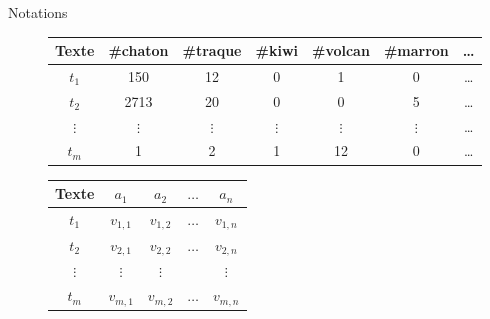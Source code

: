 \documentclass[../allslides.tex]{subfiles}
\begin{document}
\begin{frame}{Notations}
	\begin{overprint}
			\begin{figure}
				\begin{tabular}{c*{5}{S[table-format=4.0]}c}
					\toprule
					\textbf{Texte}	& {\textbf{\#chaton}}	& {\textbf{\#traque}}	& {\textbf{\#kiwi}}	& {\textbf{\#volcan}}	& {\textbf{\#marron}}	& {…}\\
					\midrule
					\(t_1\)	& 150	& 12	& 0	& 1	& 0	& …\\
					\(t_2\)	& 2713	& 20	& 0	& 0	& 5	& …\\
					\(⋮\)	& \multicolumn{1}{c}{\(⋮\)}	& 	& 	& 	& 	& …\\
					\(t_m\)	& 1	& 2	& 1	& 12	& 0	& …\\
					\bottomrule
				 \end{tabular}
			\end{figure}
			\begin{figure}
				\begin{tabular}{c*{4}{c}}
					\toprule
					\textbf{Texte}	& \(a_1\)	& \(a_2\)	& \(…\)	& \(a_n\)\\
					\midrule
					\(t_1\)	& \(v_{1,1}\)	& \(v_{1,2}\)	& \(…\) & \(v_{1,n}\)\\
					\(t_2\)	& \(v_{2,1}\)	& \(v_{2,2}\)	& \(…\) & \(v_{2,n}\)\\
					\(⋮\)	& \(⋮\)	& \(⋮\)	& 	& \(⋮\)\\
					\(t_m\)	& \(v_{m,1}\)	& \(v_{m,2}\)	& \(…\) & \(v_{m,n}\)\\
					\bottomrule
				 \end{tabular}
			\end{figure}
	\end{overprint}

\end{frame}
\end{document}
